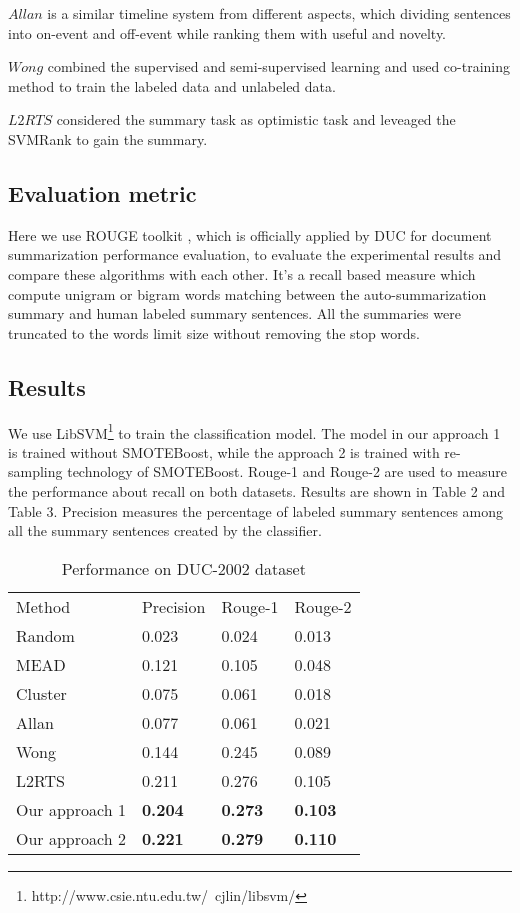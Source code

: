 \documentclass{acm_proc_article-sp}
\begin{document}
$Allan$ is a similar timeline system from different aspects, which dividing sentences into on-event and off-event while ranking them with useful and novelty.

$Wong$ combined the supervised and semi-supervised learning and used co-training method to train the labeled data and unlabeled data. 

$L2RTS$ considered the summary task as optimistic task and  leveaged the SVMRank to gain the summary.

\subsection{Evaluation metric}

Here we use ROUGE toolkit \cite{2004-Lin-p74-81} , which is officially applied by DUC for document summarization performance evaluation, to evaluate the experimental results and compare these algorithms with each other. 
It's a recall based measure which compute unigram or bigram words matching between the auto-summarization summary and human labeled summary sentences.
All the summaries were truncated to the words limit size without removing the stop words.

\subsection{Results}

We use LibSVM\footnote{http://www.csie.ntu.edu.tw/~cjlin/libsvm/} to train the classification model.
The model in our approach 1 is trained without SMOTEBoost, while the approach 2 is trained with re-sampling technology of SMOTEBoost.
Rouge-1 and Rouge-2 are used to measure the performance about recall on both datasets. Results are shown in Table 2 and Table 3.
Precision measures the percentage of labeled summary sentences among all the summary sentences created by the classifier.


\begin{table}
\caption{Performance on DUC-2002 dataset}
\centering
\begin{tabular}{llll}
\hline\noalign{\smallskip}
Method   &  Precision    & Rouge-1  				& Rouge-2 \\
\noalign{\smallskip}
\hline
\noalign{\smallskip}
Random & 0.023 			& 		0.024 			&  0.013 \\
MEAD    &	0.121			& 		0.105	 			&	0.048					 				\\
Cluster	&	0.075			&		0.061				&	0.018					 				\\
Allan		&	0.077			&		0.061				&	0.021						 			\\
Wong		&	0.144			&		0.245				&	0.089									\\
L2RTS	&	0.211			&		0.276				&	0.105						 			\\
Our approach 1	&	\textbf{0.204}	&		\textbf{0.273}				&	\textbf{0.103}	 \\
Our approach 2	&	\textbf{0.221}	&		\textbf{0.279}				&	\textbf{0.110}	 \\
\hline
\end{tabular}
\end{table}
\end{document}
